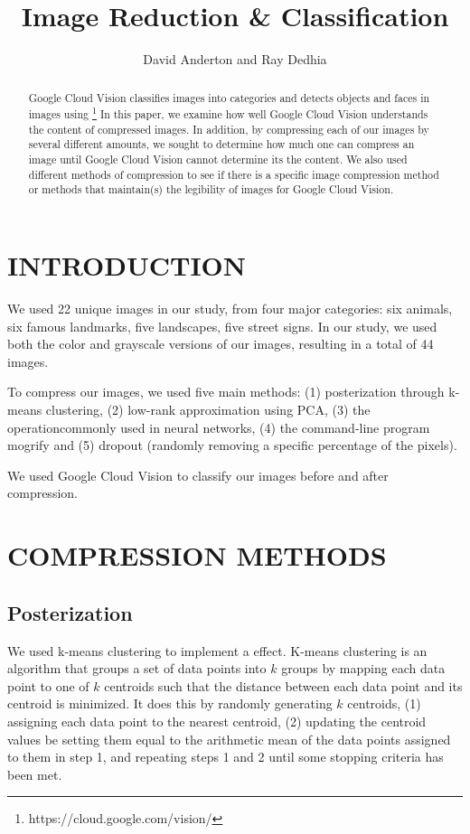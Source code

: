 \documentclass[letterpaper, 10 pt, conference]{ieeeconf}  %
\title{\LARGE \bf Image Reduction \& Classification}
\author{David Anderton and Ray Dedhia}
\begin{document}
\maketitle
\thispagestyle{empty}
\pagestyle{empty}


\begin{abstract}

Google Cloud Vision classifies 
images into categories and detects objects and faces in images using \footnote{https://cloud.google.com/vision/}
In this paper, we examine how well Google Cloud Vision understands the content
of compressed images. In addition, by compressing each of our images by several different
amounts, we sought to determine how much one can compress an image until 
Google Cloud Vision cannot determine its the content. We also used different methods
of compression to see if there is a specific image compression method or methods that
maintain(s) the legibility of images for Google Cloud Vision. 

\end{abstract}

\section{INTRODUCTION}

We used 22 unique images in our study, from four major
categories: six animals, six famous landmarks, five landscapes, five 
street signs. In our study, we used both the color and grayscale
versions of our images, resulting in a total of 44 images.

To compress our images, we used five main methods: 
(1) posterization through k-means clustering, 
(2) low-rank approximation using PCA,
(3) the  operationcommonly used in neural networks, 
(4) the command-line program mogrify
and (5) dropout (randomly removing a specific percentage of the pixels).

We used Google Cloud Vision to classify our images before and after compression.

\section{COMPRESSION METHODS}
\subsection{Posterization} 
We used k-means clustering to implement a 
effect. K-means clustering is an algorithm that groups
a set of data points into $k$ groups by mapping each data point
to one of $k$ centroids such that the distance between each data point
and its centroid is minimized. It does this by randomly generating $k$
centroids, (1) assigning each data point to the nearest centroid,
(2) updating the centroid values be setting them equal to the arithmetic
mean of the data points assigned to them in step 1, and repeating steps
1 and 2 until some stopping criteria has been met.
\end{document}
